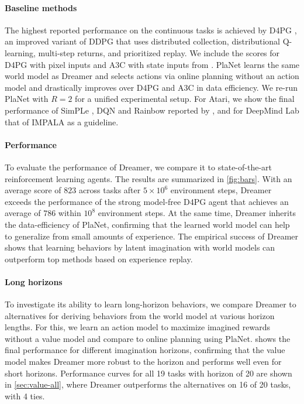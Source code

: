 \paragraph{Baseline methods}

The highest reported performance on the continuous tasks is achieved by D4PG \citep{barth2018d4pg}, an improved variant of DDPG \citep{lillicrap2015ddpg} that uses distributed collection, distributional Q-learning, multi-step returns, and prioritized replay. We include the scores for D4PG with pixel inputs and A3C \citep{mnih2016a3c} with state inputs from \citet{tassa2018dmcontrol}. PlaNet \citep{hafner2018planet} learns the same world model as Dreamer and selects actions via online planning without an action model and drastically improves over D4PG and A3C in data efficiency. We re-run PlaNet with $R=2$ for a unified experimental setup. For Atari, we show the final performance of SimPLe \citep{kaiser2019simple}, DQN \citep{mnih2015dqn} and Rainbow \citep{hessel2018rainbow} reported by \citet{castro2018dopamine}, and for DeepMind Lab that of IMPALA \citep{espeholt2018impala} as a guideline.

\vspace*{5ex}
\pagebreak

\paragraph{Performance}

To evaluate the performance of Dreamer, we compare it to state-of-the-art reinforcement learning agents. The results are summarized in \cref{fig:bars}. With an average score of $823$ across tasks after $5\times10^6$ environment steps, Dreamer exceeds the performance of the strong model-free D4PG agent that achieves an average of $786$ within $10^8$ environment steps. At the same time, Dreamer inherits the data-efficiency of PlaNet, confirming that the learned world model can help to generalize from small amounts of experience. The empirical success of Dreamer shows that learning behaviors by latent imagination with world models can outperform top methods based on experience replay.

\paragraph{Long horizons}

To investigate its ability to learn long-horizon behaviors, we compare Dreamer to alternatives for deriving behaviors from the world model at various horizon lengths. For this, we learn an action model to maximize imagined rewards without a value model and compare to online planning using PlaNet.  shows the final performance for different imagination horizons, confirming that the value model makes Dreamer more robust to the horizon and performs well even for short horizons. Performance curves for all 19 tasks with horizon of 20 are shown in \cref{sec:value-all}, where Dreamer outperforms the alternatives on 16 of 20 tasks, with 4 ties.

